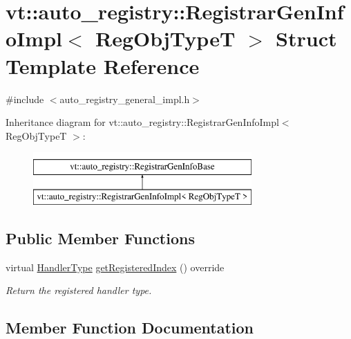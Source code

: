 \hypertarget{structvt_1_1auto__registry_1_1_registrar_gen_info_impl}{}\section{vt\+:\+:auto\+\_\+registry\+:\+:Registrar\+Gen\+Info\+Impl$<$ Reg\+Obj\+TypeT $>$ Struct Template Reference}
\label{structvt_1_1auto__registry_1_1_registrar_gen_info_impl}


{\ttfamily \#include $<$auto\+\_\+registry\+\_\+general\+\_\+impl.\+h$>$}

Inheritance diagram for vt\+:\+:auto\+\_\+registry\+:\+:Registrar\+Gen\+Info\+Impl$<$ Reg\+Obj\+TypeT $>$\+:\begin{figure}[H]
\begin{center}
\leavevmode
\includegraphics[height=2.000000cm]{structvt_1_1auto__registry_1_1_registrar_gen_info_impl}
\end{center}
\end{figure}
\subsection*{Public Member Functions}
\begin{DoxyCompactItemize}
\item 
virtual \hyperlink{namespacevt_af64846b57dfcaf104da3ef6967917573}{Handler\+Type} \hyperlink{structvt_1_1auto__registry_1_1_registrar_gen_info_impl_a7e3d92f9e79462abad5dfcf726703956}{get\+Registered\+Index} () override
\begin{DoxyCompactList}\small\item\em Return the registered handler type. \end{DoxyCompactList}\end{DoxyCompactItemize}


\subsection{Member Function Documentation}
\mbox{\label{structvt_1_1auto__registry_1_1_registrar_gen_info_impl_a7e3d92f9e79462abad5dfcf726703956}} 
